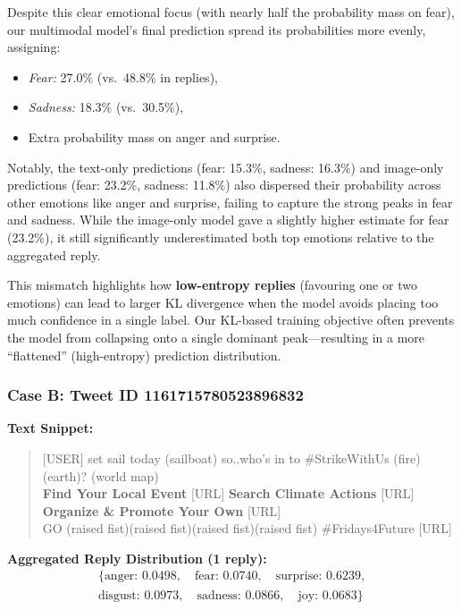 Despite this clear emotional focus (with nearly half the probability mass on fear), our multimodal model’s final prediction spread its probabilities more evenly, assigning:

\begin{itemize}
    \item \textit{Fear:} 27.0\% (vs.\ 48.8\% in replies),
    \item \textit{Sadness:} 18.3\% (vs.\ 30.5\%),
    \item Extra probability mass on anger and surprise.
\end{itemize}

Notably, the text-only predictions (fear: 15.3\%, sadness: 16.3\%) and image-only predictions (fear: 23.2\%, sadness: 11.8\%) also dispersed their probability across other emotions like anger and surprise, failing to capture the strong peaks in fear and sadness. While the image-only model gave a slightly higher estimate for fear (23.2\%), it still significantly underestimated both top emotions relative to the aggregated reply.
\newline

This mismatch highlights how \textbf{low-entropy replies} (favouring one or two emotions) can lead to larger KL divergence when the model avoids placing too much confidence in a single label. Our KL-based training objective often prevents the model from collapsing onto a single dominant peak—resulting in a more ``flattened” (high-entropy) prediction distribution.

\subsubsection*{Case B: Tweet ID 1161715780523896832}

\noindent\textbf{Text Snippet:}
\begin{quote}
[USER] set sail today (sailboat) so..who’s in to \#StrikeWithUs (fire)(earth)? (world map) \\
\textbf{Find Your Local Event} [URL] \quad
\textbf{Search Climate Actions} [URL] \quad
\textbf{Organize \& Promote Your Own} [URL] \\
GO (raised fist)(raised fist)(raised fist)(raised fist) \#Fridays4Future [URL]
\end{quote}

\noindent\textbf{Aggregated Reply Distribution (1 reply):}
\[
\begin{aligned}
\{\text{anger: } 0.0498, \quad \text{fear: } 0.0740, \quad \text{surprise: } 0.6239, \\
\text{disgust: } 0.0973, \quad \text{sadness: } 0.0866, \quad \text{joy: } 0.0683\}
\end{aligned}
\]

